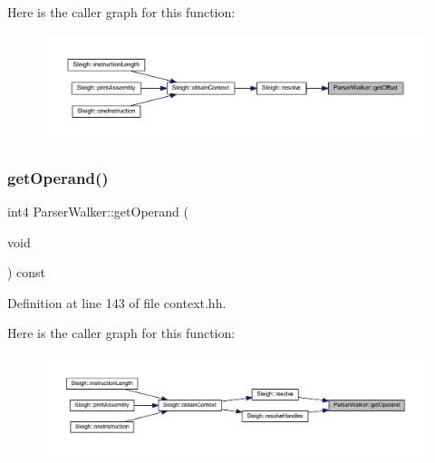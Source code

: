 Here is the caller graph for this function\+:
\nopagebreak
\begin{figure}[H]
\begin{center}
\leavevmode
\includegraphics[width=350pt]{class_parser_walker_add81e215f1dd3cdc87f6d9e78de818ad_icgraph}
\end{center}
\end{figure}
\mbox{\label{class_parser_walker_abf73ef90d42aeea7f3e9fb96eb9ad08e}} 
\subsubsection{\texorpdfstring{getOperand()}{getOperand()}}
{\footnotesize\ttfamily int4 Parser\+Walker\+::get\+Operand (\begin{DoxyParamCaption}\item[{void}]{ }\end{DoxyParamCaption}) const\hspace{0.3cm}{\ttfamily [inline]}}



Definition at line 143 of file context.\+hh.

Here is the caller graph for this function\+:
\nopagebreak
\begin{figure}[H]
\begin{center}
\leavevmode
\includegraphics[width=350pt]{class_parser_walker_abf73ef90d42aeea7f3e9fb96eb9ad08e_icgraph}
\end{center}
\end{figure}
\mbox{\label{class_parser_walker_a29772169263a35683724c03d90372734}} 
